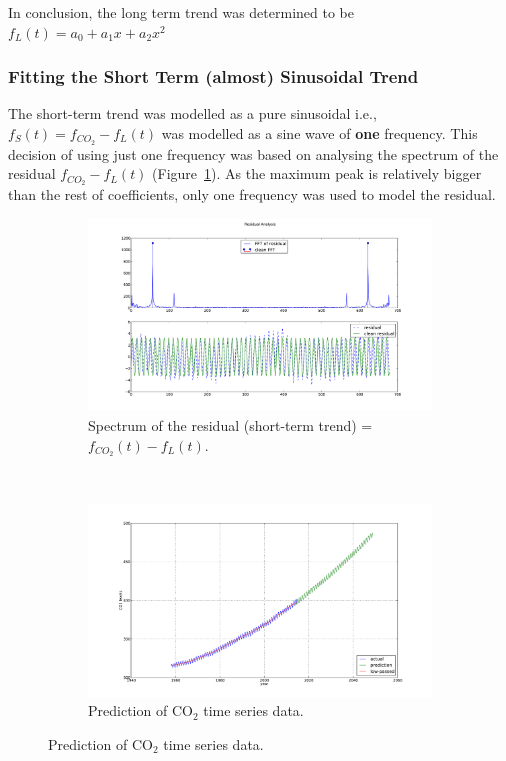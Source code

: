\documentclass[11pt]{report}
\begin{document}
In conclusion, the long term trend was determined to be $\boxed{f_L(t) = a_0 + a_1x + a_2x^2}$

\subsubsection*{Fitting the Short Term (almost) Sinusoidal Trend}
The short-term trend was modelled as a pure sinusoidal i.e., $f_S(t) = f_{CO_2} - f_L(t) $ was modelled as a sine wave of \textbf{one} frequency. This decision of using just one frequency was based on analysing the spectrum of the residual $ f_{CO_2} - f_L(t)$ (Figure~\ref{fig:co2_spectrum}). As the maximum peak is relatively bigger than the rest of coefficients, only one frequency was used to model the residual.\\

\begin{figure}[t]
\begin{center}
\begin{subfigure}[h]{\linewidth}
\includegraphics[width=18cm]{figs/co2_spectrum.pdf}
\caption[]{Spectrum of the residual (short-term trend) = $f_{CO_2}(t) - f_L(t)$.}
\label{fig:co2_spectrum}
\end{subfigure}\\
\begin{subfigure}[h]{\linewidth}
\includegraphics[width=18cm]{figs/co2_predict.pdf}
\caption[]{Prediction of $\text{CO}_2$ time series data.}
\label{fig:co2_decomp}
\end{subfigure}
\end{center}
\end{figure}
\end{document}
